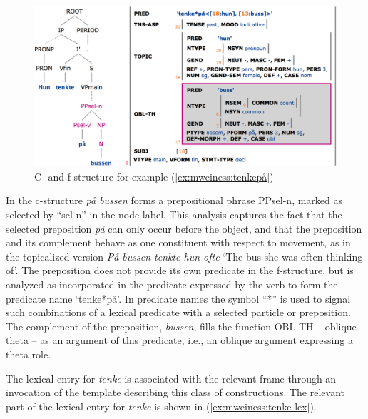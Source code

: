 \documentclass[output=paper]{langsci/langscibook}
\begin{document}
\begin{figure}
  \includegraphics[width=\textwidth]{figures/selprepcons.png}
  \caption{C- and f-structure for example (\ref{ex:mweiness:tenkepå})}
  \label{fig:mweiness:selprepcons}
\end{figure}

In the c-structure \textit{på bussen} forms a prepositional phrase PPsel-n, marked as selected by ``sel-n'' in the node label.
This analysis captures the fact that the selected preposition \textit{på} can only occur before the object, and that the preposition and its complement behave as one constituent with respect to movement, as in the topicalized version \textit{På bussen tenkte hun ofte} `The bus she was often thinking of'.
The preposition does not provide its own predicate in the f-structure, but is analyzed as incorporated in the predicate expressed by the verb to form the predicate name `tenke*på'.
In predicate names the symbol ``*'' is used to signal such combinations of a lexical predicate with a selected particle or preposition.
The complement of the preposition, \textit{bussen}, fills the function OBL-TH -- oblique-theta -- as an argument of this predicate, i.e., an oblique argument expressing a theta role.

The lexical entry for \textit{tenke} is associated with the relevant frame through an invocation of the template describing this class of constructions.
The relevant part of the lexical entry for \textit{tenke} is shown in  (\ref{ex:mweiness:tenke-lex}).

\end{document}
